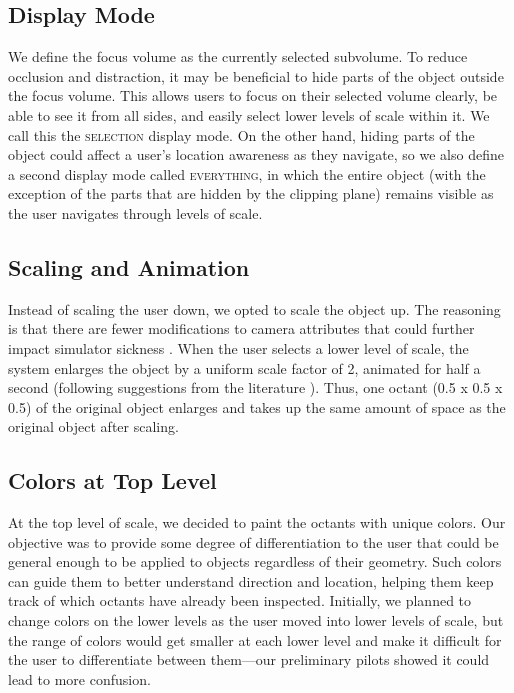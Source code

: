 \subsection{Display Mode}
We define the focus volume as the currently selected subvolume. To reduce occlusion and distraction, it may be beneficial to hide parts of the object outside the focus volume. This allows users to focus on their selected volume clearly, be able to see it from all sides, and easily select lower levels of scale within it. We call this the \textsc{selection} display mode. On the other hand, hiding parts of the object could affect a user's location awareness as they navigate, so we also define a second display mode called \textsc{everything}, in which the entire object (with the exception of the parts that are hidden by the clipping plane) remains visible as the user navigates through levels of scale.

\subsection{Scaling and Animation}
Instead of scaling the user down, we opted to scale the object up. The reasoning is that there are fewer modifications to camera attributes that could further impact simulator sickness \cite{krekhov_gullivr_2018}. When the user selects a lower level of scale, the system enlarges the object by a uniform scale factor of 2, animated for half a second (following suggestions from the literature \cite{krekhov_gullivr_2018, piumsomboon_superman_2018, cmentowski_outstanding_2019, abtahi_im_2019}). Thus, one octant (0.5 x 0.5 x 0.5) of the original object enlarges and takes up the same amount of space as the original object after scaling.

\subsection{Colors at Top Level}
At the top level of scale, we decided to paint the octants with unique colors. Our objective was to provide some degree of differentiation to the user that could be general enough to be applied to objects regardless of their geometry. Such colors can guide them to better understand direction and location, helping them keep track of which octants have already been inspected. Initially, we planned to change colors on the lower levels as the user moved into lower levels of scale, but the range of colors would get smaller at each lower level and make it difficult for the user to differentiate between them---our preliminary pilots showed it could lead to more confusion.